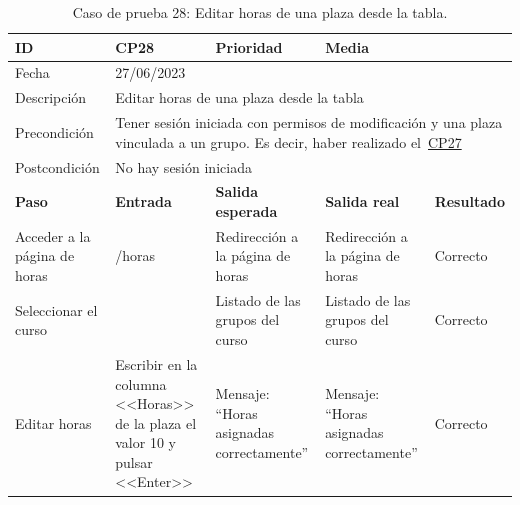 \begin{table}[H]
\small
\begin{tabular}{p{} p{} p{} p{} p{}}
\cellcolor{gray!25}
ID   & CP28 & \cellcolor{gray!25} Prioridad   & Media \\ \hline
\cellcolor{gray!25} Fecha	&	\multicolumn{4}{l}{27/06/2023} \\ \hline
\cellcolor{gray!25} Descripción		&	\multicolumn{4}{l}{Editar horas de una plaza desde la tabla} \\ \hline                                            
\cellcolor{gray!25}
Precondición  & \multicolumn{4}{p{.66\textwidth}}{Tener sesión iniciada con permisos de modificación y una plaza vinculada a un grupo. Es decir, haber realizado el~\hyperref[table:CP27]{CP27}} \\ \hline
\cellcolor{gray!25} Postcondición & \multicolumn{4}{l}{No hay sesión iniciada}                                                    \\ \hline
\rowcolor{gray!25}
\textbf{Paso}   & \textbf{Entrada} & \textbf{Salida esperada} & \textbf{Salida real} & \textbf{Resultado} \\ \hline
Acceder a la página de horas
& /horas                                                                          
& Redirección a la página de horas                                
& Redirección a la página de horas                                
& Correcto                            
\\ \hline
Seleccionar el curso
& 
& Listado de las grupos del curso
& Listado de las grupos del curso
& Correcto
\\ \hline
Editar horas
& Escribir en la columna <<Horas>> de la plaza el valor 10 y pulsar <<Enter>>
& Mensaje: ``Horas asignadas correctamente''
& Mensaje: ``Horas asignadas correctamente''
& Correcto
\\ \hline    
\end{tabular}
\caption{Caso de prueba 28: Editar horas de una plaza desde la tabla.}\label{table:CP28}
\end{table}

